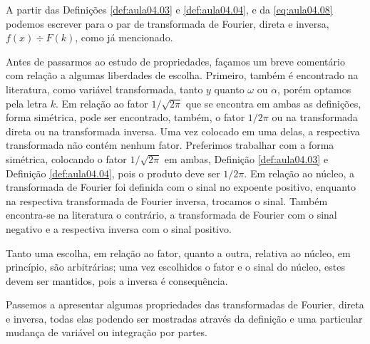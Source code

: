 A partir das Definições \ref{def:aula04.03} e \ref{def:aula04.04}, e da \autoref{eq:aula04.08} podemos escrever para o par de transformada de Fourier, direta e inversa, $f(x) \div F(k)$, como já mencionado.

Antes de passarmos ao estudo de propriedades, façamos um breve comentário com relação a algumas liberdades de escolha. Primeiro, também é encontrado na literatura, como variável transformada, tanto $y$ quanto $\omega$ ou $\alpha$, porém optamos pela letra $k$. Em relação ao fator $1/\sqrt{2\pi}$ que se encontra em ambas as definições, forma simétrica, pode ser encontrado, também, o fator $1/2\pi$ ou na transformada direta ou na transformada inversa. Uma vez colocado em uma delas, a respectiva transformada não contém nenhum fator. Preferimos trabalhar com a forma simétrica, colocando o fator $1/\sqrt{2\pi}$ em ambas, Definição \ref{def:aula04.03} e Definição \ref{def:aula04.04}, pois o produto deve ser $1/2\pi$. Em relação ao núcleo, a transformada de Fourier foi definida com o sinal no expoente positivo, enquanto na respectiva transformada de Fourier inversa, trocamos o sinal. Também encontra-se na literatura o contrário, a transformada de Fourier com o sinal negativo e a respectiva inversa com o sinal positivo.

    Tanto uma escolha, em relação ao fator, quanto a outra, relativa ao núcleo, em princípio, são arbitrárias; uma vez escolhidos o fator e o sinal do núcleo, estes devem ser mantidos, pois a inversa é consequência.

    Passemos a apresentar algumas propriedades das transformadas de Fourier, direta e inversa, todas elas podendo ser mostradas através da definição e uma particular mudança de variável ou integração por partes.


